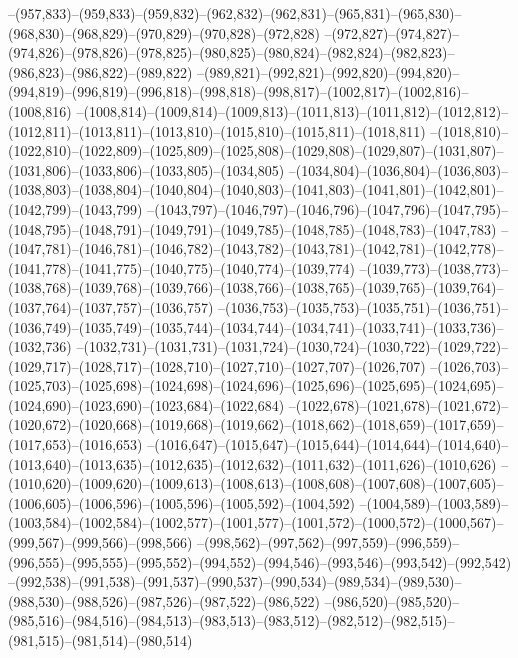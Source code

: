 --(957,833)--(959,833)--(959,832)--(962,832)--(962,831)--(965,831)--(965,830)--(968,830)--(968,829)--(970,829)--(970,828)--(972,828)
--(972,827)--(974,827)--(974,826)--(978,826)--(978,825)--(980,825)--(980,824)--(982,824)--(982,823)--(986,823)--(986,822)--(989,822)
--(989,821)--(992,821)--(992,820)--(994,820)--(994,819)--(996,819)--(996,818)--(998,818)--(998,817)--(1002,817)--(1002,816)--(1008,816)
--(1008,814)--(1009,814)--(1009,813)--(1011,813)--(1011,812)--(1012,812)--(1012,811)--(1013,811)--(1013,810)--(1015,810)--(1015,811)--(1018,811)
--(1018,810)--(1022,810)--(1022,809)--(1025,809)--(1025,808)--(1029,808)--(1029,807)--(1031,807)--(1031,806)--(1033,806)--(1033,805)--(1034,805)
--(1034,804)--(1036,804)--(1036,803)--(1038,803)--(1038,804)--(1040,804)--(1040,803)--(1041,803)--(1041,801)--(1042,801)--(1042,799)--(1043,799)
--(1043,797)--(1046,797)--(1046,796)--(1047,796)--(1047,795)--(1048,795)--(1048,791)--(1049,791)--(1049,785)--(1048,785)--(1048,783)--(1047,783)
--(1047,781)--(1046,781)--(1046,782)--(1043,782)--(1043,781)--(1042,781)--(1042,778)--(1041,778)--(1041,775)--(1040,775)--(1040,774)--(1039,774)
--(1039,773)--(1038,773)--(1038,768)--(1039,768)--(1039,766)--(1038,766)--(1038,765)--(1039,765)--(1039,764)--(1037,764)--(1037,757)--(1036,757)
--(1036,753)--(1035,753)--(1035,751)--(1036,751)--(1036,749)--(1035,749)--(1035,744)--(1034,744)--(1034,741)--(1033,741)--(1033,736)--(1032,736)
--(1032,731)--(1031,731)--(1031,724)--(1030,724)--(1030,722)--(1029,722)--(1029,717)--(1028,717)--(1028,710)--(1027,710)--(1027,707)--(1026,707)
--(1026,703)--(1025,703)--(1025,698)--(1024,698)--(1024,696)--(1025,696)--(1025,695)--(1024,695)--(1024,690)--(1023,690)--(1023,684)--(1022,684)
--(1022,678)--(1021,678)--(1021,672)--(1020,672)--(1020,668)--(1019,668)--(1019,662)--(1018,662)--(1018,659)--(1017,659)--(1017,653)--(1016,653)
--(1016,647)--(1015,647)--(1015,644)--(1014,644)--(1014,640)--(1013,640)--(1013,635)--(1012,635)--(1012,632)--(1011,632)--(1011,626)--(1010,626)
--(1010,620)--(1009,620)--(1009,613)--(1008,613)--(1008,608)--(1007,608)--(1007,605)--(1006,605)--(1006,596)--(1005,596)--(1005,592)--(1004,592)
--(1004,589)--(1003,589)--(1003,584)--(1002,584)--(1002,577)--(1001,577)--(1001,572)--(1000,572)--(1000,567)--(999,567)--(999,566)--(998,566)
--(998,562)--(997,562)--(997,559)--(996,559)--(996,555)--(995,555)--(995,552)--(994,552)--(994,546)--(993,546)--(993,542)--(992,542)
--(992,538)--(991,538)--(991,537)--(990,537)--(990,534)--(989,534)--(989,530)--(988,530)--(988,526)--(987,526)--(987,522)--(986,522)
--(986,520)--(985,520)--(985,516)--(984,516)--(984,513)--(983,513)--(983,512)--(982,512)--(982,515)--(981,515)--(981,514)--(980,514)
